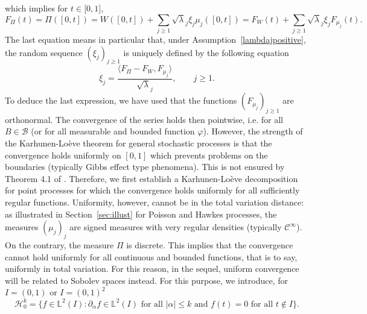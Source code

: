 \documentclass[aos]{imsart}
\theoremstyle{plain}
\theoremstyle{remark}
\newcommand{\1}{1}
\begin{document}
which implies for $t\in\mathcal [0,1]$,
\begin{equation}\label{eq:KL2}
F_{\Pi}(t) = \Pi([0,t])  = W([0,t]) + \sum_{j\geq 1}\sqrt\lambda_j\xi_j\mu_j([0,t]) = F_W(t)+ \sum_{j\geq 1}\sqrt\lambda_j\xi_jF_{\mu_j}(t). 
\end{equation}
The last equation means in particular that, under Assumption~\eqref{lambdajpositive}, the random sequence $(\xi_j)_{j\geq 1}$ is uniquely defined by the following equation 
\begin{equation}\label{def:scores1}
\xi_j = \frac{\langle F_\Pi-F_W,F_{\mu_j}\rangle}{\sqrt\lambda_j}, \qquad j\geq 1.
\end{equation}
To deduce the last expression, we have used that the functions $(F_{\mu_j})_{j\geq 1}$ are orthonormal. The convergence of the series holds then pointwise, i.e. for all $B\in\mathcal B$ (or for all measurable and bounded function $\varphi$). However, the strength of the Karhunen-Lo\`eve theorem for general stochastic processes is that the convergence holds uniformly on $[0,1]$ which prevents problems on the boundaries (typically Gibbs effect type phenomena). This is not ensured by Theorem 4.1 of  \cite{Carrizo22}. Therefore, we first establish a Karhunen-Lo\`eve decomposition for point processes for which the convergence holds uniformly for all sufficiently regular functions. Uniformity, however, cannot be in the total variation distance: as illustrated in Section~\ref{sec:illust} for Poisson and Hawkes processes, the measures $(\mu_j)_j$ are signed measures with very regular densities (typically $\mathcal C^\infty$). On the contrary, the measure $\Pi$ is discrete. This implies that the convergence cannot hold uniformly for all continuous and bounded functions, that is to say, uniformly in total variation. For this reason, in the sequel, uniform convergence will be related to Sobolev spaces instead. For this purpose, we introduce, for $I=(0,1)$ or $I=(0,1)^2$
	\[
	\mathcal H_0^{k} = \Big\{f\in \mathbb L^2(I):\partial_\alpha f\in \mathbb L^2(I) \text{ for all }|\alpha|\leq k\text{ and }f(t) = 0 \text{ for all } t\notin I \Big\}.
	\]
\end{document}
